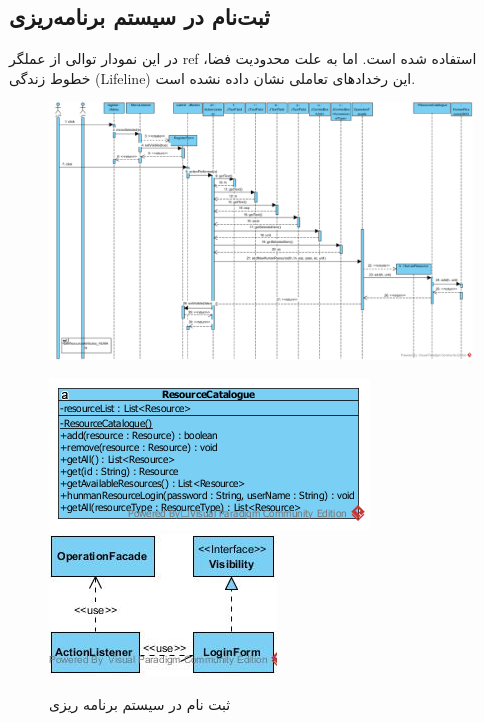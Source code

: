 \begin{landscape}
\newpage
\section{ثبت‌نام در سیستم برنامه‌ریزی}
در این نمودار توالی از عملگر ref استفاده شده است. اما به علت محدودیت فضا، خطوط زندگی (Lifeline) این رخدادهای تعاملی نشان داده نشده است.
\begin{figure}[H]
	\centering
	\includegraphics[scale=0.6]{img/sequence-design/SignUp}
\end{figure}
\begin{figure}[H]
	\centering
	\includegraphics[scale=0.5]{img/sequence-design/SignUpC}
	\includegraphics[scale=0.7]{img/sequence-design/SignUpUI}
	\caption{ثبت نام در سیستم برنامه ریزی}
\end{figure}

\newpage

\end{landscape}
